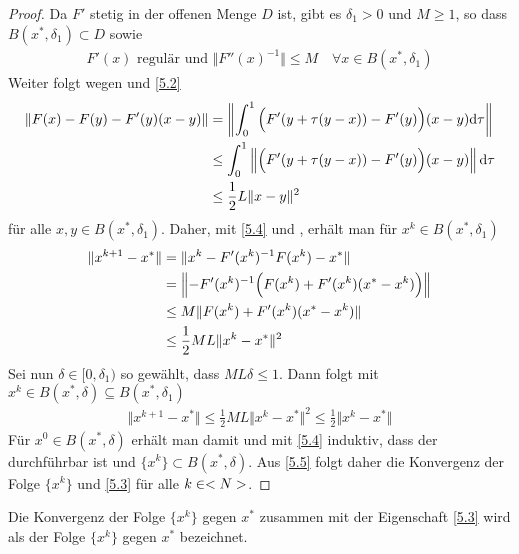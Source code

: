 \begin{proof}
	Da $F'$ stetig in der offenen Menge $D$ ist, gibt es $\delta_1>0$ und $M\ge 1$, so dass $B(x^\ast,\delta_1)\subset D$ sowie
	\begin{align}
		\label{5.4}
		F'(x)\text{ regulär und } \Vert F''(x)^{-1}\Vert\le M \quad\forall x\in B(x^\ast,\delta_1)
	\end{align}
	Weiter folgt wegen  und \cref{5.2}
	\begin{align}
		\Vert F(x) - F(y) - F'(y)(x-y)\Vert &= \left\Vert \int_0^1 \Big(F'(y+\tau(y-x)) - F'(y)\Big)(x-y)\mathrm{d} \tau\right\Vert \notag \\
		&\le \int_0^1 \left\Vert \Big(F'(y+\tau(y-x)) - F'(y)\Big)(x-y) \right\Vert\mathrm{d}\tau \notag \\
		&\le \frac{1}{2} L\Vert x-y\Vert^2 \notag
	\end{align}
	für alle $x,y\in B(x^\ast,\delta_1)$. Daher, mit \cref{5.4} und , erhält man für $x^k\in B(x^\ast,\delta_1)$
	\begin{align}
		\Vert x^{k+1}-x^\ast\Vert &= \Vert x^k - F'(x^k)^{-1}F(x^k) - x^\ast\Vert \notag \\
		&= \left\Vert -F'(x^k)^{-1}\Big(F(x^k) + F'(x ^k)(x^\ast-x^k)\Big)\right\Vert \notag \\
		&\le M\Vert F(x^k) + F'(x^k)(x^\ast-x^k)\Vert \notag \\
		&\le \frac{1}{2}ML\Vert x^k-x^\ast\Vert^2\notag
	\end{align}
	Sei nun $\delta\in [0,\delta_1)$ so gewählt, dass $ML\delta\le 1$. Dann folgt mit $x^k\in B(x^\ast,\delta)\subseteq B(x^\ast,\delta_1)$
	\begin{align}
		\label{5.5}
		\Vert x^{k+1}-x^\ast\Vert \le \frac{1}{2}ML\Vert x^k-x^\ast\Vert^2\le \frac{1}{2}\Vert x^k-x^\ast\Vert
	\end{align}
	Für $x^0\in B(x^\ast,\delta)$ erhält man damit und mit \cref{5.4} induktiv, dass der  durchführbar ist und $\{x^k\}\subset B(x^\ast,\delta)$. Aus \cref{5.5} folgt daher die Konvergenz der Folge $\{x^k\}$ und \cref{5.3} für alle $k\in<N>$.
\end{proof}

Die Konvergenz der Folge $\{x^k\}$ gegen $x^\ast$ zusammen mit der Eigenschaft \cref{5.3} wird als  der Folge $\{x^k\}$ gegen $x^\ast$ bezeichnet.


